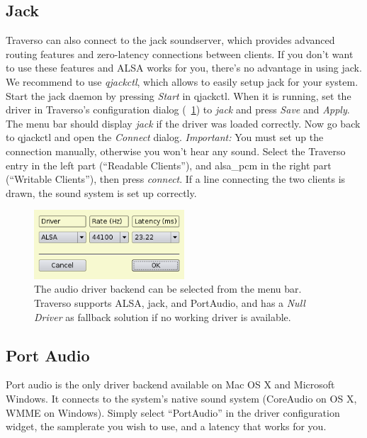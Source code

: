 \subsection{Jack}
Traverso can also connect to the jack soundserver, which provides advanced routing features and zero-latency connections between clients. If you don't want to use these features and ALSA works for you, there's no advantage in using jack. We recommend to use \emph{qjackctl}, which allows to easily setup jack for your system. Start the jack daemon by pressing \emph{Start} in qjackctl. When it is running, set the driver in Traverso's configuration dialog (\FigB\ \ref{fig_driverconf}) to \emph{jack} and press \emph{Save} and \emph{Apply}. The menu bar should display \emph{jack} if the driver was loaded correctly. Now go back to qjackctl and open the \emph{Connect} dialog. \emph{Important:} You must set up the connection manually, otherwise you won't hear any sound. Select the Traverso entry in the left part (``Readable Clients''), and alsa\_pcm in the right part (``Writable Clients''), then press \emph{connect}. If a line connecting the two clients is drawn, the sound system is set up correctly.

\begin{figure}
 \centering\includegraphics[width=0.5\textwidth]{images/sshot02.png}
 \caption{The audio driver backend can be selected from the menu bar. Traverso supports ALSA, jack, and PortAudio, and has a \emph{Null Driver} as fallback solution if no working driver is available.}
 \label{fig_driverconf}
\end{figure}

\subsection{Port Audio}
Port audio is the only driver backend available on Mac OS X and Microsoft Windows. It connects to the system's native sound system (CoreAudio on OS X, WMME on Windows). Simply select ``PortAudio'' in the driver configuration widget, the samplerate you wish to use, and a latency that works for you.
